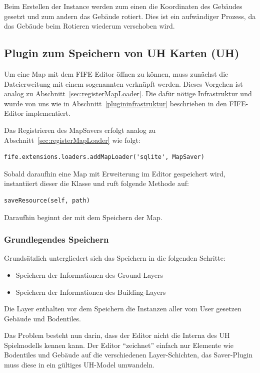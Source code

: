 Beim Erstellen der Instance werden zum einen die Koordinaten des Gebäudes
gesetzt und zum andern das Gebäude rotiert. Dies ist ein aufwändiger
Prozess, da das Gebäude beim Rotieren wiederum verschoben wird.


\subsection{Plugin zum Speichern von UH Karten (UH)}
Um eine Map mit dem FIFE Editor öffnen zu können, muss
zunächst die Dateierweitung mit einem sogenannten  verknüpft
werden. Dieses Vorgehen ist analog zu Abschnitt~\ref{sec:registerMapLoader}. Die
dafür nötige Infrastruktur und wurde von uns wie in
Abschnitt~\ref{plugininfrastruktur} beschrieben in den FIFE-Editor
implementiert.

Das Registrieren des MapSavers erfolgt analog zu Abschnitt~\ref{sec:registerMapLoader}
wie folgt:

\begin{lstlisting}
fife.extensions.loaders.addMapLoader('sqlite', MapSaver)
\end{lstlisting}

Sobald daraufhin eine Map mit  Erweiterung im Editor
gespeichert wird, instantiiert dieser die  Klasse und ruft
folgende Methode auf:

\begin{lstlisting}
saveResource(self, path)
\end{lstlisting}

Daraufhin beginnt der  mit dem Speichern der Map.

\subsubsection{Grundlegendes Speichern}
Grundsätzlich untergliedert sich das Speichern in die folgenden Schritte:
\begin{itemize}
  \item Speichern der Informationen des Ground-Layers
  \item Speichern der Informationen des Building-Layers
\end{itemize}

Die Layer enthalten vor dem Speichern die Instanzen aller vom User
gesetzen Gebäude und Bodentiles.

Das Problem besteht nun darin, dass der Editor nicht die
Interna des UH Spielmodells kennen kann. Der Editor ``zeichnet'' einfach nur
Elemente wie Bodentiles und Gebäude auf die verschiedenen Layer-Schichten, das
Saver-Plugin muss diese in ein gültiges UH-Model umwandeln.


